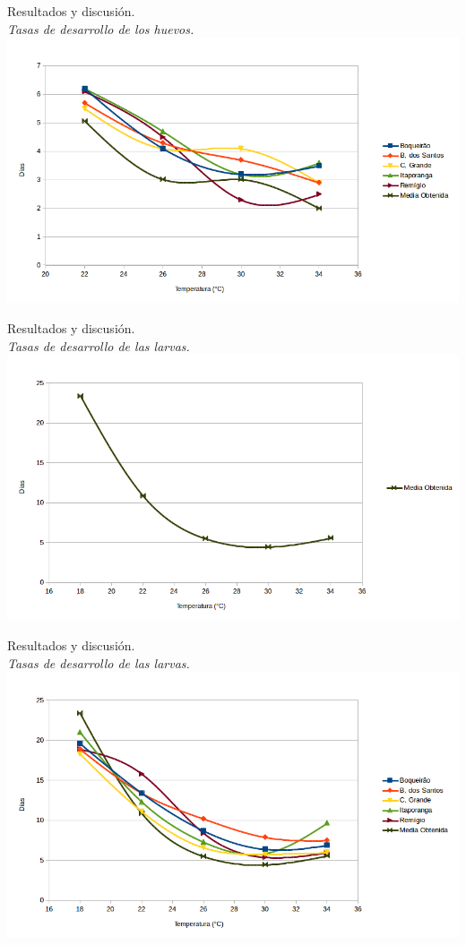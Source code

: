 \begin{frame}[t]{Resultados y discusión.\\\textit{Tasas de desarrollo de los huevos.}}
    \includegraphics[width=\textwidth]{./graphics/huevos-desarrollo.png}
\end{frame}

\begin{frame}[t]{Resultados y discusión.\\\textit{Tasas de desarrollo de las larvas.}}
    \includegraphics[width=\textwidth]{./graphics/larvas-desarrollo-single.png}
\end{frame}

\begin{frame}[t]{Resultados y discusión.\\\textit{Tasas de desarrollo de las larvas.}}
    \includegraphics[width=\textwidth]{./graphics/larvas-desarrollo.png}
\end{frame}

